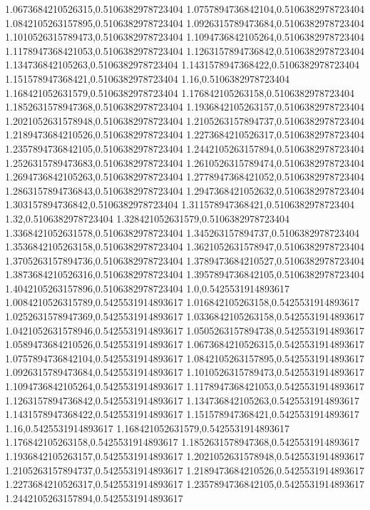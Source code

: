 1.0673684210526315,0.5106382978723404
1.0757894736842104,0.5106382978723404
1.0842105263157895,0.5106382978723404
1.0926315789473684,0.5106382978723404
1.1010526315789473,0.5106382978723404
1.1094736842105264,0.5106382978723404
1.1178947368421053,0.5106382978723404
1.1263157894736842,0.5106382978723404
1.134736842105263,0.5106382978723404
1.1431578947368422,0.5106382978723404
1.151578947368421,0.5106382978723404
1.16,0.5106382978723404
1.168421052631579,0.5106382978723404
1.176842105263158,0.5106382978723404
1.1852631578947368,0.5106382978723404
1.1936842105263157,0.5106382978723404
1.2021052631578948,0.5106382978723404
1.2105263157894737,0.5106382978723404
1.2189473684210526,0.5106382978723404
1.2273684210526317,0.5106382978723404
1.2357894736842105,0.5106382978723404
1.2442105263157894,0.5106382978723404
1.2526315789473683,0.5106382978723404
1.2610526315789474,0.5106382978723404
1.2694736842105263,0.5106382978723404
1.2778947368421052,0.5106382978723404
1.2863157894736843,0.5106382978723404
1.2947368421052632,0.5106382978723404
1.303157894736842,0.5106382978723404
1.311578947368421,0.5106382978723404
1.32,0.5106382978723404
1.328421052631579,0.5106382978723404
1.3368421052631578,0.5106382978723404
1.345263157894737,0.5106382978723404
1.3536842105263158,0.5106382978723404
1.3621052631578947,0.5106382978723404
1.3705263157894736,0.5106382978723404
1.3789473684210527,0.5106382978723404
1.3873684210526316,0.5106382978723404
1.3957894736842105,0.5106382978723404
1.4042105263157896,0.5106382978723404
1.0,0.5425531914893617
1.0084210526315789,0.5425531914893617
1.016842105263158,0.5425531914893617
1.0252631578947369,0.5425531914893617
1.0336842105263158,0.5425531914893617
1.0421052631578946,0.5425531914893617
1.0505263157894738,0.5425531914893617
1.0589473684210526,0.5425531914893617
1.0673684210526315,0.5425531914893617
1.0757894736842104,0.5425531914893617
1.0842105263157895,0.5425531914893617
1.0926315789473684,0.5425531914893617
1.1010526315789473,0.5425531914893617
1.1094736842105264,0.5425531914893617
1.1178947368421053,0.5425531914893617
1.1263157894736842,0.5425531914893617
1.134736842105263,0.5425531914893617
1.1431578947368422,0.5425531914893617
1.151578947368421,0.5425531914893617
1.16,0.5425531914893617
1.168421052631579,0.5425531914893617
1.176842105263158,0.5425531914893617
1.1852631578947368,0.5425531914893617
1.1936842105263157,0.5425531914893617
1.2021052631578948,0.5425531914893617
1.2105263157894737,0.5425531914893617
1.2189473684210526,0.5425531914893617
1.2273684210526317,0.5425531914893617
1.2357894736842105,0.5425531914893617
1.2442105263157894,0.5425531914893617
